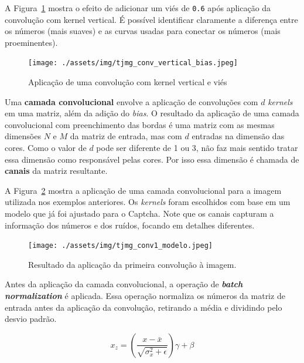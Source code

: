 \documentclass[12pt,twoside,brazilian]{book}
\begin{document}
A Figura~\ref{fig-tjmg-exemplo-conv-vertical-bias} mostra o efeito de
adicionar um viés de \texttt{0.6} após aplicação da convolução com
kernel vertical. É possível identificar claramente a diferença entre os
números (mais suaves) e as curvas usadas para conectar os números (mais
proeminentes).

\begin{figure}

{\centering \texttt{[image: ./assets/img/tjmg\_conv\_vertical\_bias.jpeg]}

}

\caption{\label{fig-tjmg-exemplo-conv-vertical-bias}Aplicação de uma
convolução com kernel vertical e viés}

\end{figure}

Uma \textbf{camada convolucional} envolve a aplicação de convoluções com
\(d\) \emph{kernels} em uma matriz, além da adição do \emph{bias}. O
resultado da aplicação de uma camada convolucional com preenchimento das
bordas é uma matriz com as mesmas dimensões \(N\) e \(M\) da matriz de
entrada, mas com \(d\) entradas na dimensão das cores. Como o valor de
\(d\) pode ser diferente de 1 ou 3, não faz mais sentido tratar essa
dimensão como responsável pelas cores. Por isso essa dimensão é chamada
de \textbf{canais} da matriz resultante.

A Figura~\ref{fig-tjmg-exemplo-camada-conv} mostra a aplicação de uma
camada convolucional para a imagem utilizada nos exemplos anteriores. Os
\emph{kernels} foram escolhidos com base em um modelo que já foi
ajustado para o Captcha. Note que os canais capturam a informação dos
números e dos ruídos, focando em detalhes diferentes.

\begin{figure}

{\centering \texttt{[image: ./assets/img/tjmg\_conv1\_modelo.jpeg]}

}

\caption{\label{fig-tjmg-exemplo-camada-conv}Resultado da aplicação da
primeira convolução à imagem.}

\end{figure}

Antes da aplicação da camada convolucional, a operação de
\textbf{\emph{batch normalization}} é aplicada. Essa operação normaliza
os números da matriz de entrada antes da aplicação da convolução,
retirando a média e dividindo pelo desvio padrão.

\[
x_z = \left(\frac{x-\bar x}{\sqrt{\sigma^2_x + \epsilon}}\right) \gamma + \beta
\]
\end{document}
